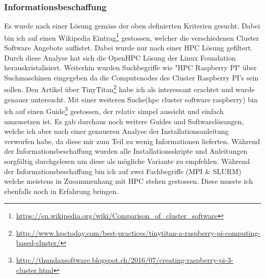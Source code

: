 \subsubsection{Informationsbeschaffung}
Es wurde nach einer Lösung gemäss der oben definierten Kriterien gesucht. Dabei bin ich auf einen Wikipedia Eintrag\footnote{\url{https://en.wikipedia.org/wiki/Comparison\_of\_cluster\_software}} gestossen, welcher die verschiedenen Cluster Software Angebote auflistet. Dabei wurde nur nach einer HPC Lösung gefiltert. Durch diese Analyse hat sich die OpenHPC Lösung der Linux Foundation herauskristalisiert. Weiterhin wurden Suchbegriffe wie "HPC Raspberry PI" über Suchmaschinen eingegeben da die Computenodes des Cluster Raspberry PI's sein sollen. Den Artikel über TinyTitan\footnote{\url{http://www.hpctoday.com/best-practices/tinytitan-a-raspberry-pi-computing-based-cluster/}} habe ich als interessant erachtet und wurde genauer untersucht.
Mit einer weiteren Suche(hpc cluster software raspberry) bin ich auf einen Guide\footnote{\url{http://thundaxsoftware.blogspot.ch/2016/07/creating-raspberry-pi-3-cluster.html}} gestossen, der relativ simpel aussieht und einfach umzusetzen ist. Es gab durchaus noch weitere Guides und Softwarelösungen, welche ich aber nach einer genaueren Analyse der Installationsanleitung verworfen habe, da diese mir zum Teil zu wenig Informationen lieferten. Während der Informationsbeschaffung wurden alle Installationsskripte und Anleitungen sorgfältig durchgelesen um diese als mögliche Variante zu empfehlen. Während der Informationsbeschaffung bin ich auf zwei Fachbegriffe (MPI \& SLURM) welche meistens in Zusammenhang mit HPC stehen gestossen. Diese musste ich ebenfalls noch in Erfahrung bringen.





